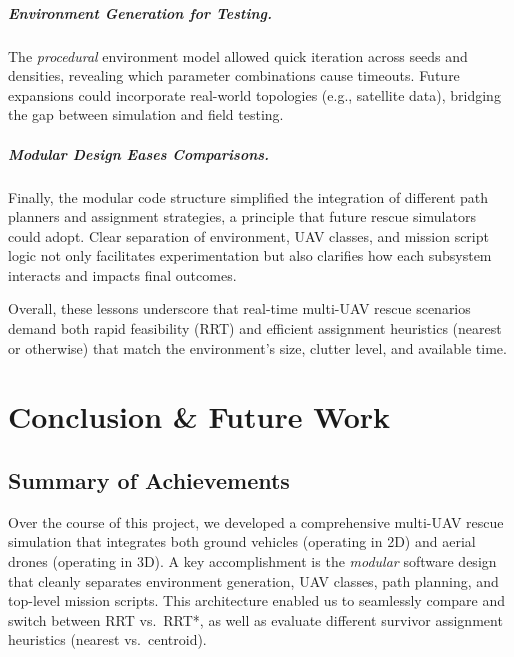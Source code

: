 \documentclass[12pt,a4paper]{report}
\begin{document}
\paragraph{Environment Generation for Testing.}
The \emph{procedural} environment model allowed quick iteration across seeds and 
densities, revealing which parameter combinations cause timeouts. Future expansions 
could incorporate real-world topologies (e.g., satellite data), bridging the gap 
between simulation and field testing.

\paragraph{Modular Design Eases Comparisons.}
Finally, the modular code structure simplified the integration of different path 
planners and assignment strategies, a principle that future rescue simulators 
could adopt. Clear separation of environment, UAV classes, and mission script 
logic not only facilitates experimentation but also clarifies how each subsystem 
interacts and impacts final outcomes.

Overall, these lessons underscore that real-time multi-UAV rescue scenarios demand 
both rapid feasibility (RRT) and efficient assignment heuristics (nearest or otherwise) 
that match the environment's size, clutter level, and available time.
\chapter{Conclusion \& Future Work}
\label{ch:conclusion}

\section{Summary of Achievements}
Over the course of this project, we developed a comprehensive multi-UAV rescue simulation
that integrates both ground vehicles (operating in 2D) and aerial drones (operating in 3D).
A key accomplishment is the \emph{modular} software design that cleanly separates
environment generation, UAV classes, path planning, and top-level mission scripts.
This architecture enabled us to seamlessly compare and switch between RRT vs.\ RRT*,
as well as evaluate different survivor assignment heuristics (nearest vs.\ centroid).
\end{document}
